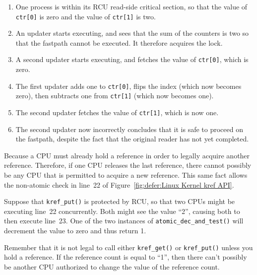 \begin{enumerate}
\item	One process is within its RCU read-side critical
	section, so that the value of {\tt ctr[0]} is zero and
	the value of {\tt ctr[1]} is two.
\item	An updater starts executing, and sees that the sum of
	the counters is two so that the fastpath cannot be
	executed.  It therefore acquires the lock.
\item	A second updater starts executing, and fetches the value
	of {\tt ctr[0]}, which is zero.
\item	The first updater adds one to {\tt ctr[0]}, flips
	the index (which now becomes zero), then subtracts
	one from {\tt ctr[1]} (which now becomes one).
\item	The second updater fetches the value of {\tt ctr[1]},
	which is now one.
\item	The second updater now incorrectly concludes that it
	is safe to proceed on the fastpath, despite the fact
	that the original reader has not yet completed.
\end{enumerate}


	  Because a CPU must already hold a reference in order
	  to legally acquire another reference.
	  Therefore, if one CPU releases the last reference,
	  there cannot possibly be any CPU that is permitted
	  to acquire a new reference.
	  This same fact allows the non-atomic check in line~22
	  of Figure~\ref{fig:defer:Linux Kernel kref API}.


	  Suppose that {\tt kref\_put()} is protected by RCU, so
	  that two CPUs might be executing line~22 concurrently.
	  Both might see the value ``2'', causing both to then
	  execute line~23.
	  One of the two instances of {\tt atomic\_dec\_and\_test()}
	  will decrement the value to zero and thus return 1.


	  Remember that it is not legal to call either {\tt kref\_get()}
	  or {\tt kref\_put()} unless you hold a reference.
	  If the reference count is equal to ``1'', then there
	  can't possibly be another CPU authorized to change the
	  value of the reference count.

